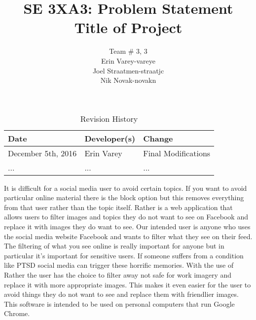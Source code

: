 \documentclass{article}
\title{SE 3XA3: Problem Statement\\Title of Project}
\author{Team \# 3, 3
		\\ Erin Varey-vareye
		\\ Joel Straatmen-straatjc
		\\ Nik Novak-novakn
}
\date{}
\begin{document}
\begin{table}[hp]
\caption{Revision History} \label{TblRevisionHistory}
\begin{tabularx}{\textwidth}{llX}
\toprule
\textbf{Date} & \textbf{Developer(s)} & \textbf{Change}\\
\midrule
December 5th, 2016 & Erin Varey & Final Modifications\\
... & ... & ...\\
\bottomrule
\end{tabularx}
\end{table}

\newpage

\maketitle

	It is difficult for a social media user to avoid certain topics. If you want to avoid particular online material there is the block option but this removes everything from that user rather than the topic itself. Rather is a web application that allows users to filter images and topics they do not want to see on Facebook and replace it with images they do want to see. Our intended user is anyone who uses the social media website Facebook and wants to filter what they see on their feed. \\
The filtering of what you see online is really important for anyone but in particular it’s important for sensitive users. If someone suffers from a condition like PTSD social media can trigger these horrific memories. With the use of Rather the user has the choice to filter away not safe for work imagery and replace it with more appropriate images. This makes it even easier for the user to avoid things they do not want to see and replace them with friendlier images.  This software is intended to be used on personal computers that run Google Chrome. 




\end{document}
